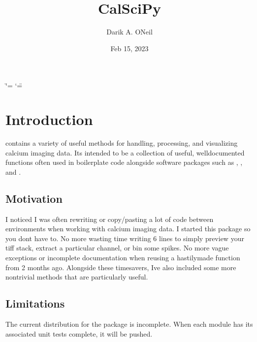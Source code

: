 \documentclass[letterpaper,10pt,english]{sphinxmanual}
\title{CalSciPy}
\date{Feb 15, 2023}
\author{Darik A.\@{} O\textquotesingle{}Neil}
\begin{document}
\ifdefined\shorthandoff
  \ifnum\catcode`\=\string=\active\shorthandoff{=}\fi
  \ifnum\catcode`\"=\active{}\fi
\fi

\pagestyle{empty}
\sphinxmaketitle
\pagestyle{plain}
\sphinxtableofcontents
\pagestyle{normal}
\label{\detokenize{index::doc}}


\sphinxstepscope


\chapter{Introduction}
\label{\detokenize{Introduction:introduction}}\label{\detokenize{Introduction::doc}}
\sphinxAtStartPar
{} contains a variety of useful methods for handling, processing, and visualizing calcium imaging data.
It\textquotesingle{}s intended to be a collection of useful, well\sphinxhyphen{}documented functions often used in boilerplate code alongside software
packages such as , ,
and .


\section{Motivation}
\label{\detokenize{Introduction:motivation}}
\sphinxAtStartPar
I noticed I was often re\sphinxhyphen{}writing or copy/pasting a lot of code between environments when working with calcium imaging
data. I started this package so you don\textquotesingle{}t have to. No more wasting time writing 6 lines to simply preview your tiff
stack, extract a particular channel, or bin some spikes. No more vague exceptions or incomplete documentation when re\sphinxhyphen{}using
a hastily\sphinxhyphen{}made function from 2 months ago. Alongside these time\sphinxhyphen{}savers, I\textquotesingle{}ve also included some more non\sphinxhyphen{}trivial methods
that are particularly useful.


\section{Limitations}
\label{\detokenize{Introduction:limitations}}
\sphinxAtStartPar
The current distribution for the package is incomplete. When each module has its associated unit tests complete, it will
be pushed.

\sphinxstepscope
\end{document}
